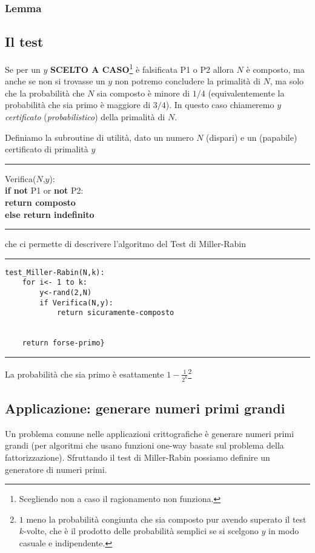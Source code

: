 \documentclass{article}
\begin{document}
\subsubsection{Lemma} 

\subsection{Il test}
Se per un $y$ \textbf{SCELTO A CASO}\footnote{Scegliendo non a caso il ragionamento non funziona.} è falsificata P1 o P2 allora $N$ è composto, ma anche se non si trovasse un $y$ non potremo concludere la primalità di $N$, ma solo che la probabilità che $N$ sia composto è minore di $1/4$ (equivalentemente la probabilità che sia primo è maggiore di $3/4$). In questo caso chiameremo $y$ \textit{certificato} (\textit{probabilistico}) della primalità di $N$.

Definiamo la subroutine di utilità, dato un numero $N$ (dispari) e un (papabile) certificato di primalità $y$
\hrule Verifica($N$,$y$):\\
\textbf{if not} P1 or \textbf{not} P2:\\
\indent    \textbf{return composto}\\
\indent    \textbf{else return indefinito}
\hrule
che ci permette di descrivere l'algoritmo del Test di Miller-Rabin
\hrule
\begin{verbatim}
test_Miller-Rabin(N,k):
    for i<- 1 to k:
        y<-rand(2,N)
        if Verifica(N,y):
            return sicuramente-composto


    return forse-primo}
 \end{verbatim} \hrule
La probabilità che sia primo è esattamente $1-\frac{1}{2^k}$\footnote{$1$ meno la probabilità congiunta che sia composto pur avendo superato il test $k$-volte, che è il prodotto delle probabilità semplici se si scelgono $y$ in modo casuale e indipendente.}

\subsection{Applicazione: generare numeri primi grandi}
Un problema comune nelle applicazioni crittografiche è generare numeri primi grandi (per algoritmi che usano funzioni one-way basate sul problema della fattorizzazione). Sfruttando il test di Miller-Rabin possiamo definire un generatore di numeri primi.
\end{document}
